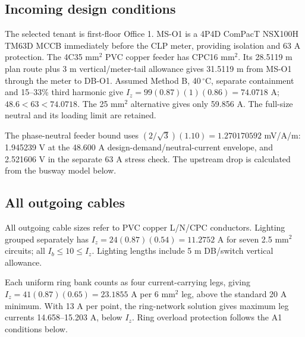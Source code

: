 \subsection*{Incoming design conditions}
The selected tenant is first-floor Office 1. MS-O1 is a 4P4D ComPacT NSX100H TM63D MCCB immediately before the CLP meter, providing isolation and 63 A protection. The 4C35 mm$^2$ PVC copper feeder has CPC16 mm$^2$. Its 28.5119 m plan route plus 3 m vertical/meter-tail allowance gives 31.5119 m from MS-O1 through the meter to DB-O1. Assumed Method B, 40\,$^\circ$C, separate containment and 15--33\% third harmonic give $I_z=99(0.87)(1)(0.86)=74.0718$ A; $48.6<63<74.0718$. The 25 mm$^2$ alternative gives only 59.856 A. The full-size neutral and its loading limit are retained.

The phase-neutral feeder bound uses $(2/\sqrt3)(1.10)=1.270170592$ mV/A/m: 1.945239 V at the 48.600 A design-demand/neutral-current envelope, and 2.521606 V in the separate 63 A stress check. The upstream drop is calculated from the busway model below.

\subsection*{All outgoing cables}
All outgoing cable sizes refer to PVC copper L/N/CPC conductors. Lighting grouped separately has $I_z=24(0.87)(0.54)=11.2752$ A for seven 2.5 mm$^2$ circuits;  all $I_b\le 10\le I_z$. Lighting lengths include 5 m DB/switch vertical allowance.

Each uniform ring bank counts as four current-carrying legs, giving $I_z=41(0.87)(0.65)=23.1855$ A per 6 mm$^2$ leg, above the standard 20 A minimum. With 13 A per point, the ring-network solution gives maximum leg currents 14.658--15.203 A, below $I_z$. Ring overload protection follows the A1 conditions below.

